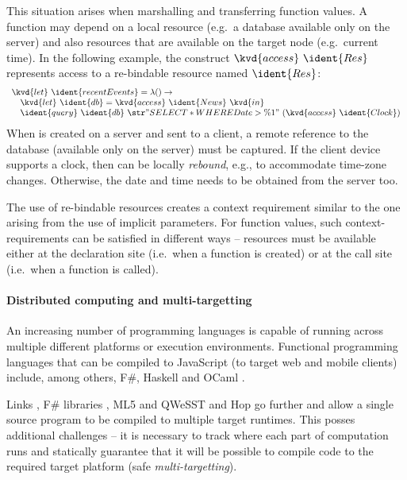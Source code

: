 This situation arises when marshalling and transferring function values. A function may depend 
on a local resource (e.g.~a database available only on the server) and also resources that are 
available on the target node (e.g.~current time). In the following example, the construct
$\kvd{access}~\ident{Res}$ represents access to a re-bindable resource named $\ident{Res}$:
%
\begin{equation*}
\begin{array}{l}
\kvd{let}~\ident{recentEvents} = \lambda () \rightarrow\\
\quad\kvd{let}~\ident{db} = \kvd{access}~\ident{News}~\kvd{in}\\
\quad\ident{query}~\ident{db}~\str{"SELECT * WHERE Date > \%1"}~(\kvd{access}~\ident{Clock})
\end{array}
\end{equation*}
%
When  is created on a server and sent to a client, a remote reference to the 
database (available only on the server) must be captured. If the client device supports a clock, 
then  can be locally \emph{rebound}, e.g., to accommodate time-zone changes. 
Otherwise, the date and time needs to be obtained from the server too.

The use of re-bindable resources creates a context requirement similar to the one arising from
the use of implicit parameters. For function values, such context-requirements can be satisfied
in different ways -- resources must be available either at the declaration site (i.e.~when a 
function is created) or at the call site (i.e.~when a function is called).


\paragraph{Distributed computing and multi-targetting}

An increasing number of programming languages is capable of running across multiple different 
platforms or execution environments. Functional programming languages that can be compiled to
JavaScript (to target web and mobile clients) include, among others, F\#, Haskell and OCaml \cite{app-ocaml-js}.

Links \cite{app-distributed-links}, F\# libraries \cite{app-fsharp-webapps,app-fsharp-webtools},
ML5 and QWeSST \cite{app-distributed-ml5, app-distributed-qwesst} and Hop \cite{app-hop-lang} go 
further and allow a single source program to be compiled to multiple target runtimes. This posses 
additional challenges -- it is necessary to track where each part of computation runs and statically 
guarantee that it will be possible to compile code to the required target platform 
(safe \emph{multi-targetting}).


